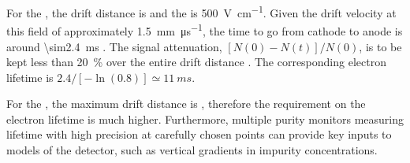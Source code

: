 %
%
%

For the , the 
 drift distance is \spmaxdrift and the \efield is \SI{500}{\volt\per\centi\meter}. Given the drift velocity at this field of approximately \SI{1.5}{\milli\meter\per\micro\second}, the time to go from cathode to anode is around \SI{\sim2.4}{\milli\second} \cite{Walkowiak:2000wf}.
The   signal attenuation, \([N(0)-N(t)]/N(0)\), is to be kept less than \SI{20}{\percent} over the entire drift distance \cite{fdtf-final-report}. The corresponding electron lifetime is $2.4/[-\ln(0.8)] \simeq \SI{11}{ms}$.

For the , the maximum drift distance is \dpmaxdrift{}, therefore the requirement on the electron lifetime is much higher.
Furthermore, multiple purity monitors measuring lifetime with high precision at carefully chosen points can provide key inputs to  models of the detector, such as vertical gradients in impurity concentrations.

